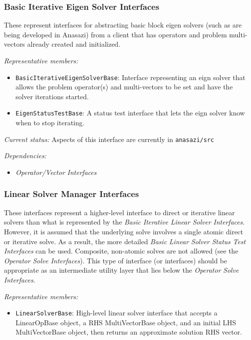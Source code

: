 \documentclass[pdf,ps2pdf,11pt]{SANDreport}
\begin{document}
%
\subsubsection{Basic Iterative Eigen Solver Interfaces}
%

These represent interfaces for abstracting basic block eigen solvers (such as
are being developed in Anasazi) from a client that has operators and problem
multi-vectors already created and initialized.

{}\textit{Representative members:}
\begin{itemize}
%
{}\item {}\texttt{BasicIterativeEigenSolverBase}: Interface representing an eign
solver that allows the problem operator(s) and multi-vectors to be set and
have the solver iterations started.
%
{}\item {}\texttt{EigenStatusTestBase}: A status test interface that lets the eign
solver know when to stop iterating.
%
\end{itemize}

{}\textit{Current status:} Aspects of this interface are currently in
{}\texttt{anasazi/src}

{}\textit{Dependencies:}
\begin{itemize}
\item {}\textit{Operator/Vector Interfaces}
\end{itemize}
%
\subsubsection{Linear Solver Manager Interfaces}
%

These interfaces represent a higher-level interface to direct or iterative
linear solvers than what is represented by the {}\textit{Basic Iterative
Linear Solver Interfaces}.  However, it is assumed that the underlying solve
involves a single atomic direct or iterative solve.  As a result, the more
detailed {}\textit{Basic Linear Solver Status Test Interfaces} can be used.
Composite, non-atomic solves are not allowed (see the {}\textit{Operator Solve
Interfaces}).  This type of interface (or interfaces) should be appropriate as
an intermediate utility layer that lies below the {}\textit{Operator Solve
Interfaces}.

{}\textit{Representative members:}
\begin{itemize}
%
{}\item {}\texttt{LinearSolverBase}: High-level linear solver interface that
accepts a LinearOpBase object, a RHS MultiVectorBase object, and an initial
LHS MultiVectorBase object, then returns an approximate solution RHS vector.
%
\end{itemize}
\end{document}
